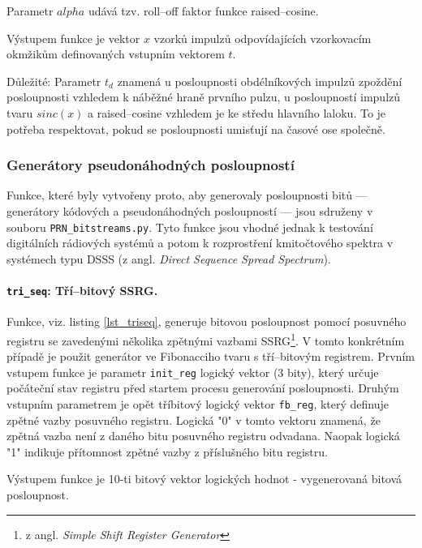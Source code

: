 Parametr $alpha$ udává tzv. roll--off faktor funkce raised--cosine.

Výstupem funkce je vektor $x$ vzorků impulzů odpovídajících vzorkovacím okmžikům definovaných vstupním vektorem $t$.



\begin{boxit}
Důležité: Parametr $t_d$ znamená u posloupnosti obdélníkových impulzů zpoždění posloupnosti vzhledem k náběžné hraně prvního pulzu, u posloupností impulzů tvaru $sinc(x)$ a raised--cosine vzhledem je ke středu hlavního laloku. To je potřeba respektovat, pokud se posloupnosti umisťují na časové ose společně.
\end{boxit}

\subsubsection{Generátory pseudonáhodných posloupností}
Funkce, které byly vytvořeny proto, aby generovaly posloupnosti bitů --- generátory kódových a pseudonáhodných posloupností --- jsou sdruženy v souboru \texttt{PRN\_bitstreams.py}. Tyto funkce jsou vhodné jednak k testování digitálních rádiových systémů a potom k rozprostření kmitočtového spektra v systémech typu DSSS (z angl. \textsl{Direct Sequence Spread Spectrum}). 

\paragraph{\texttt{tri\_seq}: Tří--bitový SSRG.}
Funkce, viz. listing \ref{lst_triseq}, generuje bitovou posloupnost pomocí posuvného registru se zavedenými několika zpětnými vazbami SSRG\footnote{z angl. \textsl{Simple Shift Register Generator}}. V tomto konkrétním případě je použit generátor ve Fibonacciho tvaru s tří--bitovým registrem. Prvním vstupem funkce je parametr \texttt{init\_reg} logický vektor (3 bity), který určuje počáteční stav registru před startem procesu generování posloupnosti. Druhým vstupním parametrem je opět tříbitový logický vektor \texttt{fb\_reg}, který definuje zpětné vazby posuvného registru. Logická "0" v tomto vektoru znamená, že zpětná vazba není z daného bitu posuvného registru odvadana. Naopak logická "1" indikuje přítomnost zpětné vazby z příslušného bitu registru.

Výstupem funkce je 10-ti bitový vektor logických hodnot - vygenerovaná bitová posloupnost.


